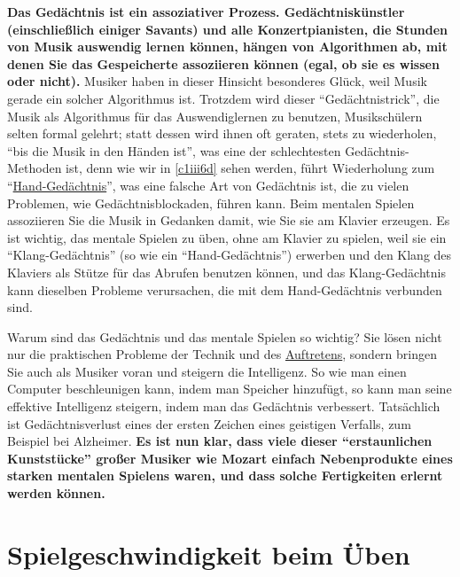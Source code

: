 \textbf{Das Gedächtnis ist ein assoziativer Prozess.
Gedächtniskünstler (einschließlich einiger Savants) und alle Konzertpianisten, die Stunden von Musik auswendig lernen können, hängen von Algorithmen ab, mit denen Sie das Gespeicherte assoziieren können (egal, ob sie es wissen oder nicht).}
Musiker haben in dieser Hinsicht besonderes Glück, weil Musik gerade ein solcher Algorithmus ist.
Trotzdem wird dieser \enquote{Gedächtnistrick}, die Musik als Algorithmus für das Auswendiglernen zu benutzen, Musikschülern selten formal gelehrt; statt dessen wird ihnen oft geraten, stets zu wiederholen, \enquote{bis die Musik in den Händen ist}, was eine der schlechtesten Gedächtnis-Methoden ist, denn wie wir in \hyperref[c1iii6d]{\ref*{c1iii6d}} sehen werden, führt Wiederholung zum \enquote{\hyperref[c1iii6d]{Hand-Gedächtnis}}, was eine falsche Art von Gedächtnis ist, die zu vielen Problemen, wie Gedächtnisblockaden, führen kann.
Beim mentalen Spielen assoziieren Sie die Musik in Gedanken damit, wie Sie sie am Klavier erzeugen.
Es ist wichtig, das mentale Spielen zu üben, ohne am Klavier zu spielen, weil sie ein \enquote{Klang-Gedächtnis} (so wie ein \enquote{Hand-Gedächtnis}) erwerben und den Klang des Klaviers als Stütze für das Abrufen benutzen können, und das Klang-Gedächtnis kann dieselben Probleme verursachen, die mit dem Hand-Gedächtnis verbunden sind.

Warum sind das Gedächtnis und das mentale Spielen so wichtig?
Sie lösen nicht nur die praktischen Probleme der Technik und des \hyperref[c1iii14]{Auftretens}, sondern bringen Sie auch als Musiker voran und steigern die Intelligenz.
So wie man einen Computer beschleunigen kann, indem man Speicher hinzufügt, so kann man seine effektive Intelligenz steigern, indem man das Gedächtnis verbessert.
Tatsächlich ist Gedächtnisverlust eines der ersten Zeichen eines geistigen Verfalls, zum Beispiel bei Alzheimer.
\textbf{Es ist nun klar, dass viele dieser \enquote{erstaunlichen Kunststücke} großer Musiker wie Mozart einfach Nebenprodukte eines starken mentalen Spielens waren, und dass solche Fertigkeiten erlernt werden können.}


\section{Spielgeschwindigkeit beim Üben}
\label{c1ii13}

